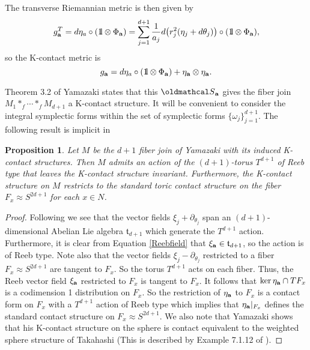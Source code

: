 \documentclass[12pt]{amsart}
\newtheorem{proposition}[theorem]{Proposition}
\def\BOne{{\mathchoice {\rm 1\mskip-4mu l} {\rm 1\mskip-4mu l}
                          {\rm 1\mskip-4.5mu l} {\rm 1\mskip-5mu l}}}
\def\gro{\omega}
\def\bfa{{\bf a}}
\def\cals{{\oldmathcal S}}
\def\gt{{\mathfrak t}}
\begin{document}
The transverse Riemannian metric is then given by
\begin{equation}\label{transKah}
g_\bfa^T =d\eta_a\circ(\BOne\otimes \Phi_\bfa)=\sum_{j=1}^{d+1}\frac{1}{a_j}d\bigl(r^2_j(\eta_j+d\theta_j)\bigr)\circ(\BOne\otimes \Phi_\bfa),
\end{equation}
so the K-contact metric is
\begin{equation}\label{Kconmetric}
g_\bfa= d\eta_a\circ(\BOne\otimes \Phi_\bfa) +\eta_\bfa\otimes \eta_\bfa.
\end{equation}

Theorem 3.2 of Yamazaki states that this $\cals_\bfa$ gives the fiber join $M_1*_f\cdots *_fM_{d+1}$ a K-contact structure. It will be convenient to consider the integral symplectic forms within the set of symplectic forms $\{\gro_j\}_{j=1}^{d+1}$. The following result is implicit in \cite{Yam99}

\begin{proposition}\label{imyam}
Let $M$ be the $d+1$ fiber join of Yamazaki with its induced K-contact structures. Then $M$ admits an action of the $(d+1)$-torus $T^{d+1}$ of Reeb type that leaves the K-contact structure invariant. Furthermore, the K-contact structure on $M$ restricts to the standard toric contact structure on the fiber $F_x\approx S^{2d+1}$ for each $x\in N$. 
\end{proposition}

\begin{proof}
Following \cite{Yam99} we see that the vector fields $\xi_j+\partial_{\theta_j}$ span an $(d+1)$-dimensional Abelian Lie algebra $\gt_{d+1}$ which generate the $T^{d+1}$ action. Furthermore, it is clear from Equation \eqref{Reebfield} that $\xi_\bfa\in\gt_{d+1}$, so the action is of Reeb type. Note also that the vector fields $\xi_j-\partial_{\theta_j}$ restricted to a fiber $F_x\approx S^{2d+1}$ are tangent to $F_x$. So the torus $T^{d+1}$ acts on each fiber. Thus, the Reeb vector field $\xi_\bfa$ restricted to $F_x$ is tangent to $F_x$. It follows that $\ker\eta_\bfa\cap TF_x$ is a codimension 1 distribution on $F_x$. So the restriction of $\eta_\bfa$ to $F_x$ is a contact form on $F_x$ with a $T^{d+1}$ action of Reeb type which implies that $\eta_\bfa |_{F_x}$ defines the standard contact structure on $F_x\approx S^{2d+1}$. We also note that Yamazaki shows that his K-contact structure on the sphere is contact equivalent to the weighted sphere structure of Takahashi \cite{Tak78} (This is described by Example 7.1.12 of \cite{BG05}). 
\end{proof}
\end{document}
